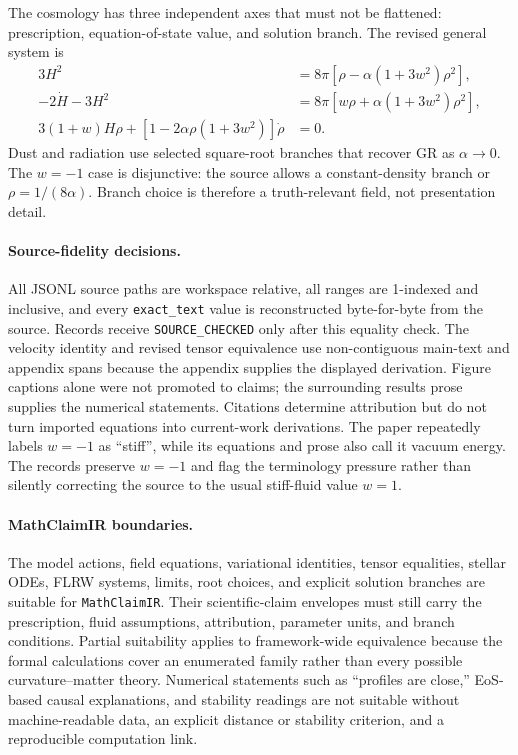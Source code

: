 The cosmology has three independent axes that must not be flattened: prescription, equation-of-state value, and solution branch. The revised general system is
\begin{align}
3H^2&=8\pi[\rho-\alpha(1+3w^2)\rho^2],\\
-2\dot H-3H^2&=8\pi[w\rho+\alpha(1+3w^2)\rho^2],\\
3(1+w)H\rho+[1-2\alpha\rho(1+3w^2)]\dot\rho&=0.
\end{align}
Dust and radiation use selected square-root branches that recover GR as $\alpha\to0$. The $w=-1$ case is disjunctive: the source allows a constant-density branch or $\rho=1/(8\alpha)$. Branch choice is therefore a truth-relevant field, not presentation detail.

\paragraph{Source-fidelity decisions.}
All JSONL source paths are workspace relative, all ranges are 1-indexed and inclusive, and every \texttt{exact\_text} value is reconstructed byte-for-byte from the source. Records receive \texttt{SOURCE\_CHECKED} only after this equality check. The velocity identity and revised tensor equivalence use non-contiguous main-text and appendix spans because the appendix supplies the displayed derivation. Figure captions alone were not promoted to claims; the surrounding results prose supplies the numerical statements. Citations determine attribution but do not turn imported equations into current-work derivations. The paper repeatedly labels $w=-1$ as ``stiff'', while its equations and prose also call it vacuum energy. The records preserve $w=-1$ and flag the terminology pressure rather than silently correcting the source to the usual stiff-fluid value $w=1$.

\paragraph{MathClaimIR boundaries.}
The model actions, field equations, variational identities, tensor equalities, stellar ODEs, FLRW systems, limits, root choices, and explicit solution branches are suitable for \texttt{MathClaimIR}. Their scientific-claim envelopes must still carry the prescription, fluid assumptions, attribution, parameter units, and branch conditions. Partial suitability applies to framework-wide equivalence because the formal calculations cover an enumerated family rather than every possible curvature--matter theory. Numerical statements such as ``profiles are close,'' EoS-based causal explanations, and stability readings are not suitable without machine-readable data, an explicit distance or stability criterion, and a reproducible computation link.

